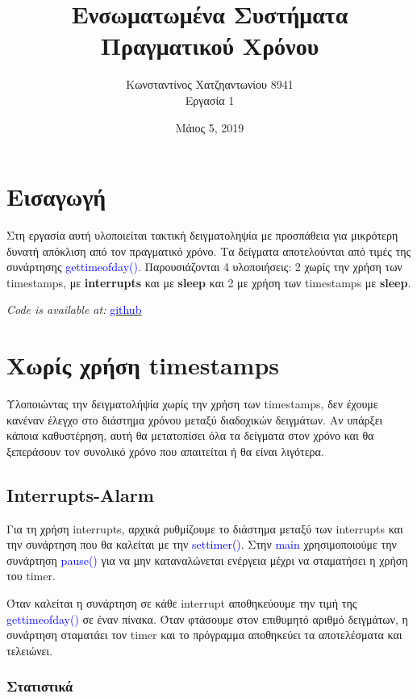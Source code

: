 \documentclass[12pt,a4paper]{article}
\author{Κωνσταντίνος Χατζηαντωνίου 8941 \\ Εργασία 1}
\title{Ενσωματωμένα Συστήματα Πραγματικού Χρόνου}
\date{Μάιος 5, 2019}
\begin{document}
\maketitle

\section*{Εισαγωγή}

Στη εργασία αυτή υλοποιείται τακτική δειγματοληψία με προσπάθεια για μικρότερη δυνατή απόκλιση από τον πραγματικό χρόνο. Τα δείγματα αποτελούνται από τιμές της συνάρτησης  \textcolor{blue}{gettimeofday()}. Παρουσιάζονται 4 υλοποιήσεις: 2 χωρίς την χρήση των timestamps, με \textbf{interrupts} και με \textbf{sleep} και 2 με χρήση των timestamps με \textbf{sleep}.

\noindent
\textit{Code is available at:} \href{https://github.com/KonstantinosChatziantoniou/RealTimeEmbeddedSystems_Course}{\textcolor{blue}{github}}

\section{Χωρίς χρήση timestamps}

Υλοποιώντας την δειγματολήψία χωρίς την χρήση των timestamps, δεν έχουμε κανέναν έλεγχο στο διάστημα χρόνου μεταξύ διαδοχικών δειγμάτων. Αν υπάρξει κάποια καθυστέρηση, αυτή θα μετατοπίσει όλα τα δείγματα στον χρόνο και θα ξεπεράσουν τον συνολικό χρόνο που απαιτείται ή θα είναι λιγότερα.

\subsection{Interrupts-Alarm}
Για τη χρήση interrupts, αρχικά ρυθμίζουμε το διάστημα μεταξύ των interrupts και την συνάρτηση που θα καλείται με την \textcolor{blue}{settimer()}. Στην \textcolor{blue}{main} χρησιμοποιούμε την συνάρτηση \textcolor{blue}{pause()} για να μην καταναλώνεται ενέργεια μέχρι να σταματήσει η χρήση του timer.

Όταν καλείται η συνάρτηση σε κάθε interrupt αποθηκεύουμε την τιμή της  \textcolor{blue}{gettimeofday()} σε έναν πίνακα. Όταν φτάσουμε στον επιθυμητό αριθμό δειγμάτων, η συνάρτηση σταματάει τον timer και το πρόγραμμα αποθηκεύει τα αποτελέσματα και τελειώνει.

\subsubsection*{Στατιστικά}
\end{document}
